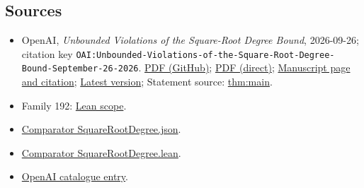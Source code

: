 \documentclass[11pt]{article}
\begin{document}
\subsection{Sources}
\begin{itemize}
\item OpenAI, \emph{Unbounded Violations of the Square-Root Degree Bound}, 2026-09-26; citation key \texttt{OAI:Unbounded-Violations-of-the-Square-Root-Degree-Bound-September-26-2026}. \href{https://github.com/openai/math/blob/adc7f1241b42e322a6451854ab7e4b4c146bf78a/preprints/Unbounded-Violations-of-the-Square-Root-Degree-Bound-September-26-2026/Unbounded-Violations-of-the-Square-Root-Degree-Bound-September-26-2026.pdf}{PDF (GitHub)}; \href{https://github.com/openai/math/raw/adc7f1241b42e322a6451854ab7e4b4c146bf78a/preprints/Unbounded-Violations-of-the-Square-Root-Degree-Bound-September-26-2026/Unbounded-Violations-of-the-Square-Root-Degree-Bound-September-26-2026.pdf}{PDF (direct)}; \href{https://github.com/openai/math/blob/adc7f1241b42e322a6451854ab7e4b4c146bf78a/preprints/Unbounded-Violations-of-the-Square-Root-Degree-Bound-September-26-2026/README.md}{Manuscript page and citation}; \href{https://github.com/openai/math/blob/main/preprints/Unbounded-Violations-of-the-Square-Root-Degree-Bound-September-26-2026/Unbounded-Violations-of-the-Square-Root-Degree-Bound-September-26-2026.pdf}{Latest version}; Statement source: \href{https://github.com/openai/math/blob/adc7f1241b42e322a6451854ab7e4b4c146bf78a/preprints/Unbounded-Violations-of-the-Square-Root-Degree-Bound-September-26-2026/build/sections/00-introduction.tex\#L23}{thm:main}.
\item Family 192: \href{https://github.com/openai/math/blob/adc7f1241b42e322a6451854ab7e4b4c146bf78a/lean/docs/192.md}{Lean scope}.
\item \href{https://github.com/openai/math/blob/adc7f1241b42e322a6451854ab7e4b4c146bf78a/lean/ComparatorChallenges/SquareRootDegree.json}{Comparator SquareRootDegree.json}.
\item \href{https://github.com/openai/math/blob/adc7f1241b42e322a6451854ab7e4b4c146bf78a/lean/ComparatorChallenges/SquareRootDegree.lean}{Comparator SquareRootDegree.lean}.
\item \href{https://github.com/openai/math/blob/adc7f1241b42e322a6451854ab7e4b4c146bf78a/CONTENTS.md}{OpenAI catalogue entry}.
\end{itemize}
\end{document}
